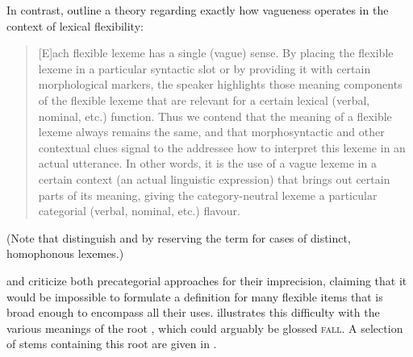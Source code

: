 In contrast, \textcite[539--541]{HengeveldRijkhoffSiewierska2004} outline a theory regarding exactly how vagueness operates in the context of lexical flexibility:

\blockquote[{\cite[541]{HengeveldRijkhoff2005}}]{[E]ach flexible lexeme has a single (vague) sense. By placing the flexible lexeme in a particular syntactic slot or by providing it with certain morphological markers, the speaker highlights those meaning components of the flexible lexeme that are relevant for a certain lexical (verbal, nominal, etc.) function. Thus we contend that the meaning of a flexible lexeme always remains the same, and that morphosyntactic and other contextual clues signal to the addressee how to interpret this lexeme in an actual utterance. In other words, it is the use of a vague lexeme in a certain context (an actual linguistic expression) that brings out certain parts of its meaning, giving the category-neutral lexeme a particular categorial (verbal, nominal, etc.) flavour.}

\noindent (Note that \citeauthor{HengeveldRijkhoff2005} distinguish  and  by reserving the term  for cases of distinct, homophonous lexemes.)

\textcite[363--364]{EvansOsada2005} and \textcite{Kihm2017} criticize both precategorial approaches for their imprecision, claiming that it would be impossible to formulate a definition for many flexible items that is broad enough to encompass all their uses. \textcite[87]{Kihm2017} illustrates this difficulty with the various meanings of the  root , which could arguably be glossed \textsc{fall}. A selection of stems containing this root are given in .

